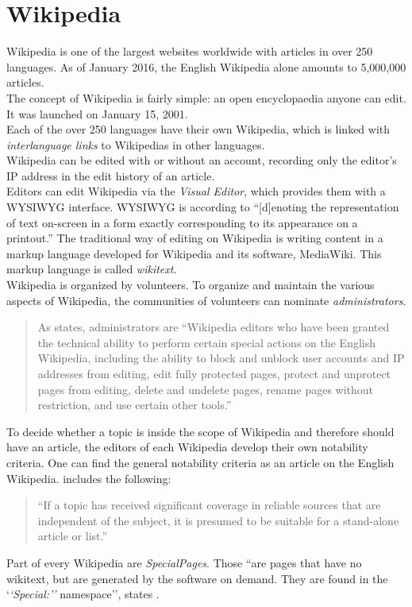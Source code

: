 \section{Wikipedia}
Wikipedia is one of the largest websites worldwide with articles in over 250 languages. As of January 2016, the English Wikipedia alone amounts to 5,000,000 articles. \citep{wiki:32} \\
The concept of Wikipedia is fairly simple: an open encyclopaedia anyone can edit. It was launched on January 15, 2001. \citep{wiki:31} \\
Each of the over 250 languages have their own Wikipedia, which is linked with \textit{interlanguage links} to Wikipedias in other languages. \\
Wikipedia can be edited with or without an account, recording only the editor's IP address in the edit history of an article. \\
Editors can edit Wikipedia via the \textit{Visual Editor}, which provides them with a WYSIWYG interface. WYSIWYG is according to \citet{wysiwyg} ``[d]enoting the representation of text on-screen in a form exactly corresponding to its appearance on a printout.'' The traditional way of editing on Wikipedia is writing content in a markup language developed for Wikipedia and its software, MediaWiki. This markup language is called \textit{wikitext}. \\
Wikipedia is organized by volunteers. To organize and maintain the various aspects of Wikipedia, the communities of volunteers can nominate \textit{administrators}.
\begin{quote}
	As \citet{wiki:10} states, administrators are ``Wikipedia editors who have been granted the technical ability to perform certain special actions on the English Wikipedia, including the ability to block and unblock user accounts and IP addresses from editing, edit fully protected pages, protect and unprotect pages from editing, delete and undelete pages, rename pages without restriction, and use certain other tools.''
\end{quote}

To decide whether a topic is inside the scope of Wikipedia and therefore should have an article, the editors of each Wikipedia develop their own notability criteria. One can find the general notability criteria as an article on the English Wikipedia. \citet{wiki:11} includes the following: 
\begin{quote}
 ``If a topic has received significant coverage in reliable sources that are independent of the subject, it is presumed to be suitable for a stand-alone article or list.''
\end{quote}

Part of every Wikipedia are \textit{SpecialPages}. Those ``are pages that have no wikitext, but are generated by the software on demand. They are found in the `\textit{`Special:''} namespace'', states \citet{wiki:12}.

